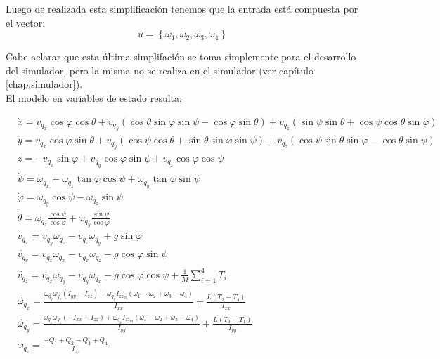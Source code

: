 \documentclass[main]{subfiles}
\begin{document}
Luego de realizada esta simplificaci\'on tenemos que la entrada est\'a compuesta por el vector:
\begin{equation}
u=\left\lbrace\omega_1, \omega_2, \omega_3, \omega_4\right\rbrace
\end{equation}

Cabe aclarar que esta \'ultima simplifaci\'on se toma simplemente para el desarrollo del simulador, pero la misma no se realiza en el simulador (ver cap\'itulo \ref{chap:simulador}).\\

El modelo en variables de estado resulta:

\begin{equation}
\boxed{\begin{aligned}&\dot{x}=v_{q_x} \cos \varphi \cos \theta + v_{q_y} ( \cos \theta \sin \varphi \sin \psi-\cos \varphi \sin \theta ) + v_{q_z}(\sin \psi \sin \theta + \cos \psi \cos \theta \sin \varphi)\\
&\dot{y}=v_{q_x} \cos \varphi \sin \theta + v_{q_y} (\cos \psi \cos \theta + \sin \theta \sin \varphi \sin \psi) + v_{q_z}( \cos \psi \sin \theta \sin \varphi-\cos \theta \sin \psi )\\
&\dot{z}= -v_{q_x} \sin \varphi  + v_{q_y} \cos \varphi \sin \psi  + v_{q_z}\cos \varphi \cos \psi\\
&\dot{\psi}=\omega_{q_x} + \omega_{q_z}\tan\varphi \cos\psi + \omega_{q_y}\tan\varphi \sin\psi\\
&\dot{\varphi}=\omega_{q_y}\cos \psi - \omega_{q_z}\sin\psi\\
&\dot{\theta}=\omega_{q_z} \frac{\cos\psi}{\cos\varphi}  + \omega_{q_y}\frac{\sin\psi}{\cos\varphi}\\
&\dot{v_{q_x}}=v_{q_y} \omega_{q_z} - v_{q_z} \omega_{q_y}+g\sin\varphi\\
&\dot{v_{q_y}}=v_{q_z} \omega_{q_x} - v_{q_x} \omega_{q_z}-g\cos\varphi\sin\psi\\
&\dot{v_{q_z}}=v_{q_x} \omega_{q_y} - v_{q_y} \omega_{q_x}-g\cos\varphi\cos\psi+\frac{1}{M}\sum_{i=1}^4T_i\\
&\dot{\omega_{q_x}}=\frac{\omega_{q_y}\omega_{q_z}(I_{yy}-I_{zz})+\omega_{q_y}I_{zz_m}(\omega_1-\omega_2+\omega_3-\omega_4)}{I_{xx}}+\frac{L(T_2-T_4)}{I_{xx}}\\
&\dot{\omega_{q_y}}=\frac{\omega_{q_x}\omega_{q_z}(-I_{xx}+I_{zz})+\omega_{q_x}I_{zz_m}(\omega_1-\omega_2+\omega_3-\omega_4)}{{I_{yy}}}+\frac{L(T_3-T_1)}{I_{yy}}\\
&\dot{\omega_{q_z}}=\frac{-Q_1+Q_2-Q_3+Q_4}{I_{zz}}\\
\end{aligned}}
\label{eq:modelo}
\end{equation}
\end{document}
